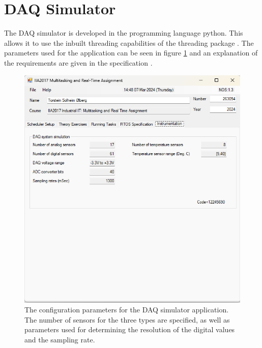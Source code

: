 \documentclass[12pt, A4paper, english]{book}
\begin{document}
		\section{DAQ Simulator}
The DAQ simulator is developed in the programming language python. This allows it to use the inbuilt threading capabilities of the threading package \cite{threading}. The parameters used for the application can be seen in figure \ref{im:DAQparams} and an explanation of the requirements are given in the specification \cite{task}.
			\begin{figure}
\centering
\includegraphics[width=\linewidth]{Parameters_4}
\caption{The configuration parameters for the DAQ simulator application. The number of sensors for the three types are specified, as well as parameters used for determining the resolution of the digital values and the sampling rate.}
\label{im:DAQparams}
			\end{figure}
\end{document}
